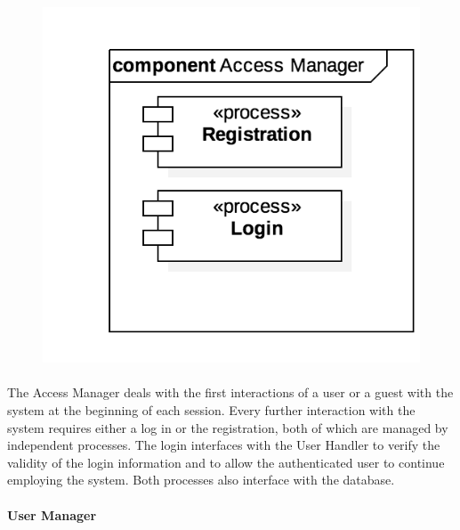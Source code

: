 			\begin{figure}[h]
				\includegraphics[scale=0.4, center]{img/component_diagrams/02_access_manager.png}
			\end{figure}
			
		\paragraph{}The Access Manager deals with the first interactions of a user or a guest with the system at the beginning of each session. Every further interaction with the system requires either a log in or the registration, both of which are managed by independent processes. The login interfaces with the User Handler to verify the validity of the login information and to allow the authenticated user to continue employing the system. Both processes also interface with the database.
		
		
		
		
		\paragraph{User Manager}
		
